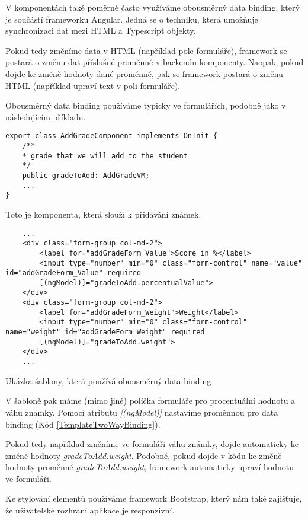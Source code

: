 V komponentách také poměrně často využíváme obousměrný data binding, který je součástí frameworku Angular. Jedná se o techniku, která umožňuje synchronizaci dat mezi HTML a Typescript objekty.

Pokud tedy změníme data v HTML (například pole formuláře), framework se postará o změnu dat příslušné proměnné v backendu komponenty. Naopak, pokud dojde ke změně hodnoty dané proměnné, pak se framework postará o změnu HTML (například upraví text v poli formuláře).

Obousměrný data binding používáme typicky ve formulářích, podobně jako v následujícím příkladu.

\lstset{style=typescript}
\begin{lstlisting}
export class AddGradeComponent implements OnInit {
	/**
	* grade that we will add to the student
	*/
	public gradeToAdd: AddGradeVM;
	...
}
\end{lstlisting}

Toto je komponenta, která slouží k přidávání známek. 

\lstset{style=html}
\begin{program}
	\begin{lstlisting}
	...
	<div class="form-group col-md-2">
		<label for="addGradeForm_Value">Score in %</label>
		<input type="number" min="0" class="form-control" name="value" id="addGradeForm_Value" required
		[(ngModel)]="gradeToAdd.percentualValue">
	</div>
	<div class="form-group col-md-2">
		<label for="addGradeForm_Weight">Weight</label>
		<input type="number" min="0" class="form-control" name="weight" id="addGradeForm_Weight" required
		[(ngModel)]="gradeToAdd.weight">
	</div>
	...
	\end{lstlisting}
	\caption{Ukázka šablony, která používá obousměrný data binding}
	\label{TemplateTwoWayBinding}
\end{program}

V šabloně pak máme (mimo jiné) políčka formuláře pro procentuální hodnotu a váhu známky.
Pomocí atributu \textit{[(ngModel)]} nastavíme proměnnou pro data binding (Kód \ref{TemplateTwoWayBinding}). 

Pokud tedy například změníme ve formuláři váhu známky, dojde automaticky ke změně hodnoty \textit{gradeToAdd.weight}. Podobně, pokud dojde v kódu ke změně hodnoty proměnné \textit{gradeToAdd.weight}, framework automaticky upraví hodnotu ve formuláři.

Ke stylování elementů používáme framework Bootstrap, který nám také zajišťuje, že uživatelské rozhraní aplikace je responzivní.

